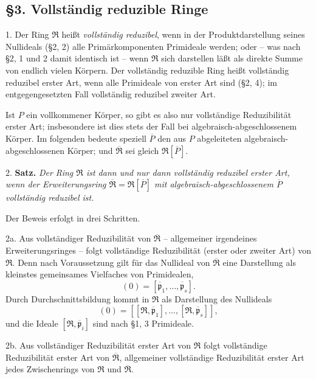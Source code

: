 \documentclass[11pt]{article}
\providecommand{\mR}{\mathfrak{R}}
\providecommand{\bR}{\overline{\mathfrak{R}}}
\providecommand{\bP}{\overline{P}}
\providecommand{\bp}{\overline{\mathfrak{p}}}
\begin{document}
\subsection*{§3. Vollständig reduzible Ringe}

1. Der Ring $\mR$ heißt \emph{vollständig reduzibel}, wenn in der Produktdarstellung seines Nullideals (§2, 2) alle Primärkomponenten Primideale werden; oder -- was nach §2, 1 und 2 damit identisch ist -- wenn $\mR$ sich darstellen läßt als direkte Summe von endlich vielen Körpern. Der vollständig reduzible Ring heißt vollständig reduzibel erster Art, wenn alle Primideale von erster Art sind (§2, 4); im entgegengesetzten Fall vollständig reduzibel zweiter Art.

Ist $P$ ein vollkommener Körper, so gibt es also nur vollständige Reduzibilität erster Art; insbesondere ist dies stets der Fall bei algebraisch-abgeschlossenem Körper. Im folgenden bedeute speziell $\bP$ den aus $P$ abgeleiteten algebraisch-abgeschlossenen Körper; und $\bR$ sei gleich $\mR[\bP]$.

2. \textbf{Satz.} \emph{Der Ring $\mR$ ist dann und nur dann vollständig reduzibel erster Art, wenn der Erweiterungsring $\bR=\mR[\bP]$ mit algebraisch-abgeschlossenem $\bP$ vollständig reduzibel ist.}

Der Beweis erfolgt in drei Schritten.

2a. Aus vollständiger Reduzibilität von $\bR$ -- allgemeiner irgendeines Erweiterungsringes -- folgt vollständige Reduzibilität (erster oder zweiter Art) von $\mR$. Denn nach Voraussetzung gilt für das Nullideal von $\bR$ eine Darstellung als kleinstes gemeinsames Vielfaches von Primidealen,
\[
        (0)=[\bp_1,\ldots,\bp_s].
\]
Durch Durchschnittsbildung kommt in $\mR$ als Darstellung des Nullideals
\[
        (0)=[[\mR,\bp_1],\ldots,[\mR,\bp_s]],
\]
und die Ideale $[\mR,\bp_i]$ sind nach §1, 3 Primideale.

2b. Aus vollständiger Reduzibilität erster Art von $\mR$ folgt vollständige Reduzibilität erster Art von $\bR$, allgemeiner vollständige Reduzibilität erster Art jedes Zwischenrings von $\mR$ und $\bR$.
\end{document}
